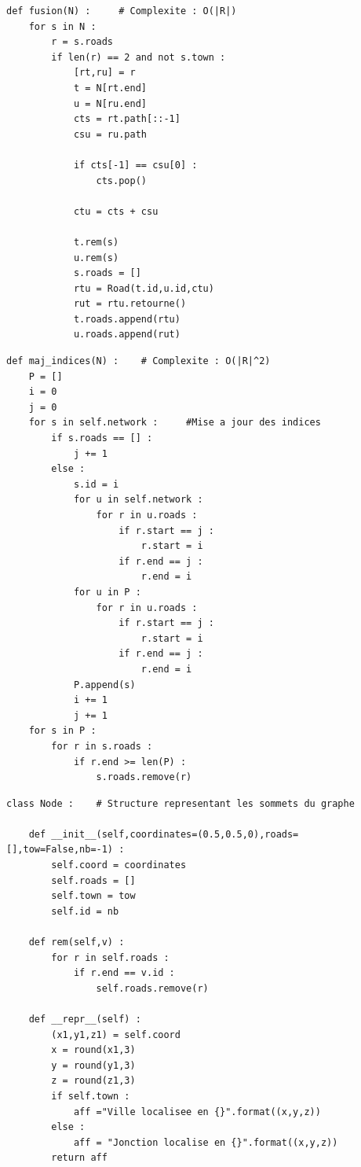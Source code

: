 \documentclass{beamer}[11pt]
\begin{document}
		\begin{frame}[containsverbatim]
\begin{lstlisting}
def fusion(N) :		# Complexite : O(|R|)
    for s in N :
        r = s.roads
        if len(r) == 2 and not s.town :
            [rt,ru] = r
            t = N[rt.end]
            u = N[ru.end]
            cts = rt.path[::-1]
            csu = ru.path

            if cts[-1] == csu[0] :
                cts.pop()

            ctu = cts + csu

            t.rem(s)
            u.rem(s)
            s.roads = []
            rtu = Road(t.id,u.id,ctu)
            rut = rtu.retourne()
            t.roads.append(rtu)
            u.roads.append(rut)
\end{lstlisting}
		\end{frame}

		\begin{frame}[containsverbatim]
\begin{lstlisting}
def maj_indices(N) :	# Complexite : O(|R|^2)
    P = []
    i = 0
    j = 0
    for s in self.network :     #Mise a jour des indices
        if s.roads == [] :
            j += 1
        else :
            s.id = i
            for u in self.network :
                for r in u.roads :
                    if r.start == j :
                        r.start = i
                    if r.end == j :
                        r.end = i
            for u in P :
                for r in u.roads :
                    if r.start == j :
                        r.start = i
                    if r.end == j :
                        r.end = i
            P.append(s)
            i += 1
            j += 1
    for s in P :
        for r in s.roads :
            if r.end >= len(P) :
                s.roads.remove(r)
\end{lstlisting}
		\end{frame}

		\begin{frame}[containsverbatim]
\begin{lstlisting}
class Node :	# Structure representant les sommets du graphe

    def __init__(self,coordinates=(0.5,0.5,0),roads=[],tow=False,nb=-1) :
        self.coord = coordinates
        self.roads = []
        self.town = tow
        self.id = nb

    def rem(self,v) :
        for r in self.roads :
            if r.end == v.id :
                self.roads.remove(r)

    def __repr__(self) :
        (x1,y1,z1) = self.coord
        x = round(x1,3)
        y = round(y1,3)
        z = round(z1,3)
        if self.town :
            aff ="Ville localisee en {}".format((x,y,z))
        else :
            aff = "Jonction localise en {}".format((x,y,z))
        return aff
\end{lstlisting}
		\end{frame}
\end{document}
